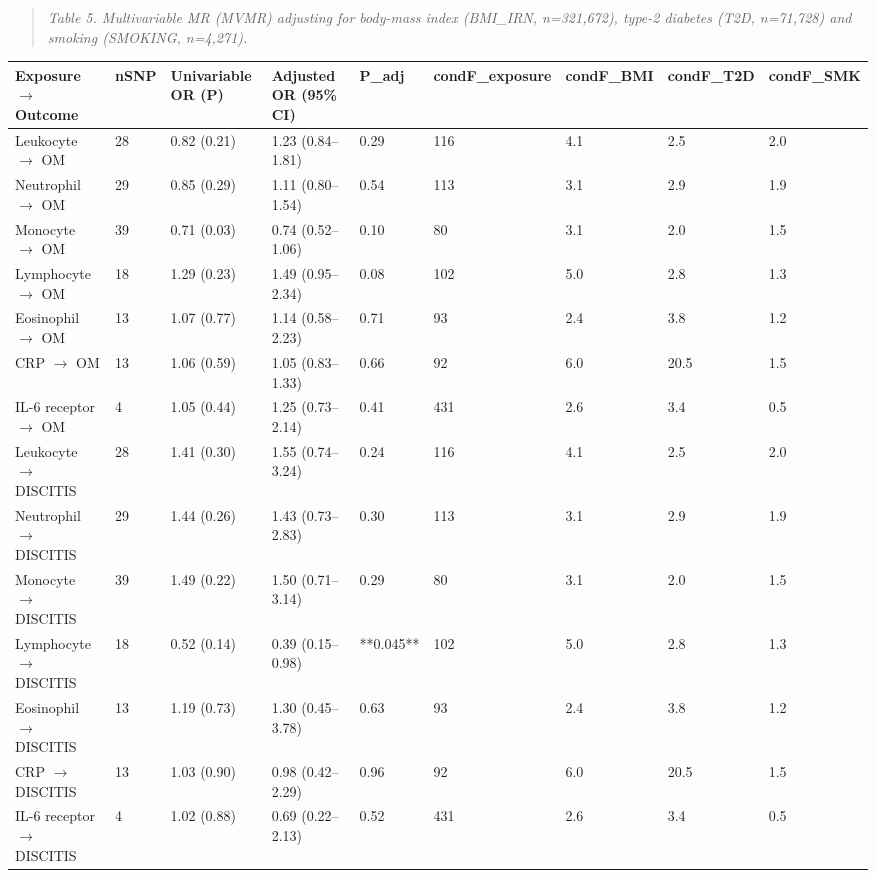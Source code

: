 \documentclass[11pt]{article}
\begin{document}
\begin{quote}\emph{Table 5. Multivariable MR (MVMR) adjusting for body-mass index (BMI\_IRN, n=321,672), type-2 diabetes (T2D, n=71,728) and smoking (SMOKING, n=4,271).}\end{quote}
\begin{table}[ht]\centering
\begin{tabular}{lllllllll}
\toprule
Exposure $\rightarrow$  Outcome & nSNP & Univariable OR (P) & Adjusted OR (95\% CI) & P\_adj & condF\_exposure & condF\_BMI & condF\_T2D & condF\_SMK \\
\midrule
Leukocyte $\rightarrow$  OM & 28 & 0.82 (0.21) & 1.23 (0.84--1.81) & 0.29 & 116 & 4.1 & 2.5 & 2.0 \\
Neutrophil $\rightarrow$  OM & 29 & 0.85 (0.29) & 1.11 (0.80--1.54) & 0.54 & 113 & 3.1 & 2.9 & 1.9 \\
Monocyte $\rightarrow$  OM & 39 & 0.71 (0.03) & 0.74 (0.52--1.06) & 0.10 & 80 & 3.1 & 2.0 & 1.5 \\
Lymphocyte $\rightarrow$  OM & 18 & 1.29 (0.23) & 1.49 (0.95--2.34) & 0.08 & 102 & 5.0 & 2.8 & 1.3 \\
Eosinophil $\rightarrow$  OM & 13 & 1.07 (0.77) & 1.14 (0.58--2.23) & 0.71 & 93 & 2.4 & 3.8 & 1.2 \\
CRP $\rightarrow$  OM & 13 & 1.06 (0.59) & 1.05 (0.83--1.33) & 0.66 & 92 & 6.0 & 20.5 & 1.5 \\
IL-6 receptor $\rightarrow$  OM & 4 & 1.05 (0.44) & 1.25 (0.73--2.14) & 0.41 & 431 & 2.6 & 3.4 & 0.5 \\
Leukocyte $\rightarrow$  DISCITIS & 28 & 1.41 (0.30) & 1.55 (0.74--3.24) & 0.24 & 116 & 4.1 & 2.5 & 2.0 \\
Neutrophil $\rightarrow$  DISCITIS & 29 & 1.44 (0.26) & 1.43 (0.73--2.83) & 0.30 & 113 & 3.1 & 2.9 & 1.9 \\
Monocyte $\rightarrow$  DISCITIS & 39 & 1.49 (0.22) & 1.50 (0.71--3.14) & 0.29 & 80 & 3.1 & 2.0 & 1.5 \\
Lymphocyte $\rightarrow$  DISCITIS & 18 & 0.52 (0.14) & 0.39 (0.15--0.98) & **0.045** & 102 & 5.0 & 2.8 & 1.3 \\
Eosinophil $\rightarrow$  DISCITIS & 13 & 1.19 (0.73) & 1.30 (0.45--3.78) & 0.63 & 93 & 2.4 & 3.8 & 1.2 \\
CRP $\rightarrow$  DISCITIS & 13 & 1.03 (0.90) & 0.98 (0.42--2.29) & 0.96 & 92 & 6.0 & 20.5 & 1.5 \\
IL-6 receptor $\rightarrow$  DISCITIS & 4 & 1.02 (0.88) & 0.69 (0.22--2.13) & 0.52 & 431 & 2.6 & 3.4 & 0.5 \\
\bottomrule
\end{tabular}
\end{table}
\end{document}
